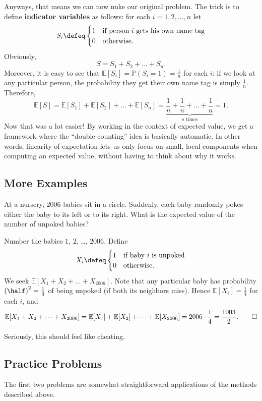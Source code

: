 \documentclass[11pt]{scrartcl}
\newcommand\EE{\mathbb E}
\newcommand\PP{\mathbb P}
\begin{document}
Anyways, that means we can now nuke our original problem.
The trick is to define \textbf{indicator variables} as follows: for each $i=1,2,\dots,n$ let
\[
  S_i \defeq
  \begin{cases}
    1 & \text{if person $i$ gets his own name tag} \\
    0 & \text{otherwise}.
  \end{cases}
  \]
Obviously, \[ S = S_1 + S_2 + \dots + S_n. \]
Moreover, it is easy to see that $\EE[S_i] = \PP(S_i = 1) =  \frac 1n$ for each $i$:
if we look at any particular person, the probability they get their own name tag is
simply $\frac 1n$.
Therefore,
\[ \EE[S] = \EE[S_1] + \EE[S_2] + \dots + \EE[S_n]
  = \underbrace{\frac1n + \frac1n + \dots + \frac 1n}_{\text{$n$ times}}
  = 1. \]
Now that was a lot easier!
By working in the context of expected value, we get a framework
where the ``double-counting'' idea is basically automatic.
In other words, linearity of expectation lets us only focus on small, local components
when computing an expected value, without having to think about why it works.

\subsection{More Examples}
\begin{example}
  [HMMT 2006] At a nursery, $2006$ babies sit in a circle. Suddenly, each baby randomly pokes either the baby to its left or to its right. What is the expected value of the number of unpoked babies?
\end{example}
\begin{soln}
  Number the babies $1$, $2$, \dots, $2006$.  Define
  \[
    X_i \defeq
    \begin{cases}
      1 & \text{if baby $i$ is unpoked} \\
      0 & \text{otherwise}.
    \end{cases}
  \]
  We seek $\EE[X_1 + X_2 + \dots + X_{2006}]$.
  Note that any particular baby has probability $\left( \half \right)^2 = \frac 14$ of being unpoked (if both its neighbors miss).
  Hence $\EE[X_i] = \frac 14$ for each $i$, and
  \[ \EE[X_1 + X_2 + \dots + X_{2006}]
  = \EE[X_1] + \EE[X_2] + \dots + \EE[X_{2006}]
  = 2006 \cdot \frac 14
  = \frac{1003}{2}. \qedhere \]
\end{soln}
Seriously, this should feel like cheating.

\subsection{Practice Problems}
The first two problems are somewhat straightforward applications of the methods described above.
\end{document}
